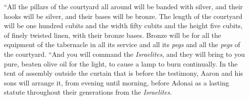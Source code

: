 \begin{biblechapter}
\verse “All the pillars of the courtyard all around will be banded with silver, and their hooks will be silver, and their bases will be bronze.
\verse The length of the courtyard will be one hundred cubits and the width fifty cubits and the height five cubits, of finely twisted linen, with their bronze bases.
\verse Bronze will be for all the equipment of the tabernacle in all its service and all its \textit{pegs} and all the \textit{pegs} of the courtyard.
 “And you will command the \textit{Israelites}, and they will bring to you pure, beaten olive oil for the light, to cause a lamp to burn continually.
\verse In the tent of assembly outside the curtain that is before the testimony, Aaron and his sons will arrange it, from evening until morning, before Adonai as a lasting statute throughout their generations from the \textit{Israelites}.
\end{biblechapter}

